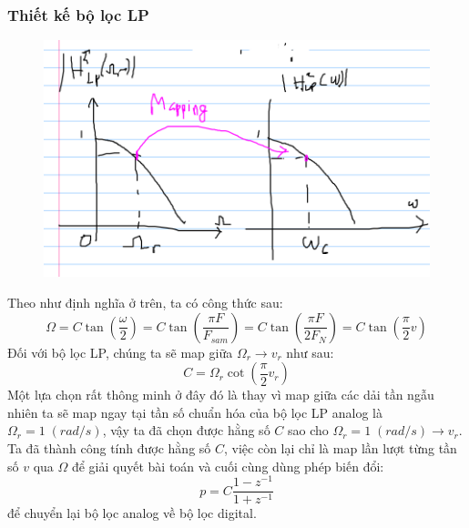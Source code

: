 \documentclass{article}
\begin{document}
\subsubsection{Thiết kế bộ lọc LP}
\begin{figure}[H]
  \begin{center}
  \includegraphics[width=13cm]{15.png}
  \end{center}
  \end{figure}
Theo như định nghĩa ở trên, ta có công thức sau:
$$\Omega=C\tan\left(\frac{\omega}{2}\right)=C\tan\left(\frac{\pi F}{F_{sam}}\right)=C\tan{\left(\frac{\pi F}{2F_{N}}\right)}=C\tan{\left(\frac{\pi}{2}v\right)}$$
Đối với bộ lọc LP, chúng ta sẽ map giữa $\Omega_{r}\rightarrow v_{r}$ như sau:
$$C=\Omega_{r}\cot{\left(\frac{\pi}{2}v_{r}\right)}$$
Một lựa chọn rất thông minh ở đây đó là thay vì map giữa các dải tần ngẫu nhiên ta sẽ map ngay tại tần số chuẩn hóa của bộ lọc LP analog là $\Omega_{r}=1\; (rad/s)$, vậy ta
đã chọn được hằng số $C$ sao cho $\Omega_{r}=1\; (rad/s)\rightarrow v_{r}$. Ta đã thành công tính được hằng số $C$, việc còn lại chỉ là map lần lượt từng tần số $v$ qua $\Omega$ để giải quyết bài toán
và cuối cùng dùng phép biến đổi:
$$p=C\frac{1-z^{-1}}{1+z^{-1}}$$ 
để chuyển lại bộ lọc analog về bộ lọc digital.
\end{document}
